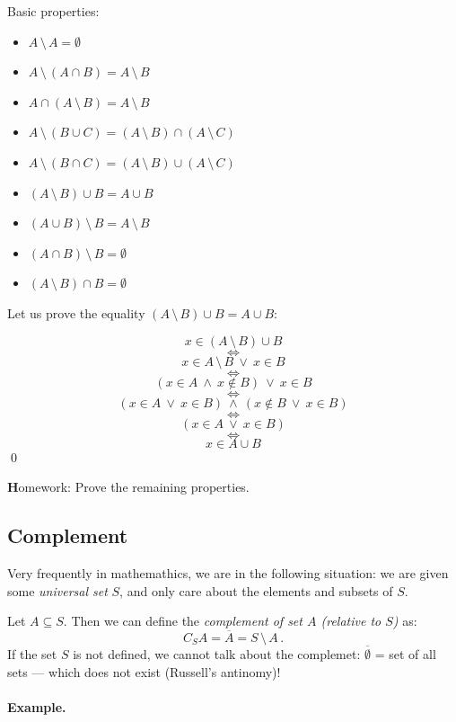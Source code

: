 \documentclass[11pt,paper=b5,footinclude,headinclude]{scrbook} %
\def\ali {{~\vee~}}
\def\inn {{~\wedge~}}
\def\brez {{\,\setminus\,}}
\def\cee {{~\Leftrightarrow~}}
\theoremstyle{remark}
\theoremstyle{definition} %
\begin{document}
Basic properties:
\begin{itemize}
  \item $A\brez A = \emptyset$

  \item $A\brez (A\cap B) = A\brez B$

  \item $A\cap (A\brez B) = A\brez B$

  \item $A\brez (B\cup C) = (A\brez B)\cap (A\brez C)$

  \item $A\brez (B\cap C) = (A\brez B)\cup (A\brez C)$

  \item $(A\brez B)\cup B = A\cup B$

  \item $(A\cup B)\brez B = A\brez B$

  \item $(A\cap B)\brez B = \emptyset$

  \item $(A\brez B)\cap B = \emptyset$
\end{itemize}

Let us prove the equality $(A\brez B)\cup B = A\cup B$:

$$x\in (A\brez B)\cup B$$
$$\cee$$
$$x\in A\brez B \ali x\in B$$
$$\cee$$
$$(x\in A\inn x\not\in B) \ali x\in B$$
$$\cee$$
$$(x\in A\ali x\in B) \inn (x\not\in B \ali x\in B)$$
$$\cee$$
$$(x\in A\ali x\in B)$$
$$\cee$$
$$x\in A\cup B$$
\qed

\bigskip
{\textbf Homework:} Prove the remaining properties.

\bigskip
\bigskip

\subsection{Complement}
Very frequently in mathemathics, we are in the following situation: we are given some
{\em universal set} $S$, and only care about the elements and subsets of $S$.

Let $A\subseteq S$. Then we can define the  {\em complement of set $A$ (relative to $S$)} as:
$$C_SA = \overline A = S\brez A\,.$$
If the set $S$ is not defined, we cannot talk about the complemet:
$\overline \emptyset$ = set of all sets  --- which does not exist (Russell's antinomy)!

\bigskip
\paragraph{Example.}
\end{document}
